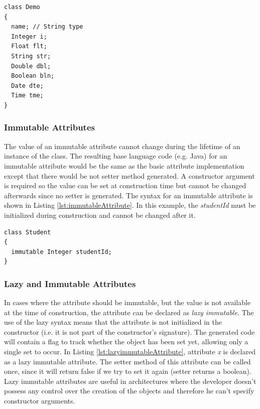 \begin{lstlisting}[style=umplePlain, label=lst:basicAttribute,caption=Basic Umple attribute]
class Demo 
{
  name; // String type
  Integer i;
  Float flt;
  String str;  
  Double dbl;
  Boolean bln;
  Date dte; 
  Time tme;
}
\end{lstlisting}

\subsubsection{Immutable Attributes}
The value of an immutable attribute cannot change during the lifetime of an instance of the class. The resulting base language code (e.g. Java) for an immutable attribute would be the same as the basic attribute implementation except that there would be not setter method generated. A constructor argument is required so the value can be set at construction time but  cannot be changed afterwards since no setter is generated. The syntax for an immutable attribute is shown in Listing \ref{lst:immutableAttribute}. In this example, the \textit{studentId} must be initialized during construction and cannot be changed after it. 

\begin{lstlisting}[style=umplePlain,label=lst:immutableAttribute, caption=Immutable Umple attribute]
class Student 
{
  immutable Integer studentId;
}
\end{lstlisting}

\subsubsection{Lazy and Immutable Attributes}
In cases where the attribute should be immutable, but the value is not available at the time of construction, the attribute can be declared as \textit{lazy immutable}. The use of the lazy syntax means that the attribute is not initialized in the constructor (i.e. it is not part of the constructor's signature). The generated code will contain a flag to track whether the object has been set yet, allowing only a single set to occur. In Listing \ref{lst:lazyimmutableAttribute},
attribute \textit{x} is declared as a lazy immutable attribute. The setter method of this attribute can be called once, since it will return false if we try to set it again (setter returns a boolean). Lazy immutable attributes are useful in architectures where the developer doesn't possess any control over the creation of the objects and therefore he can't specify constructor arguments.

